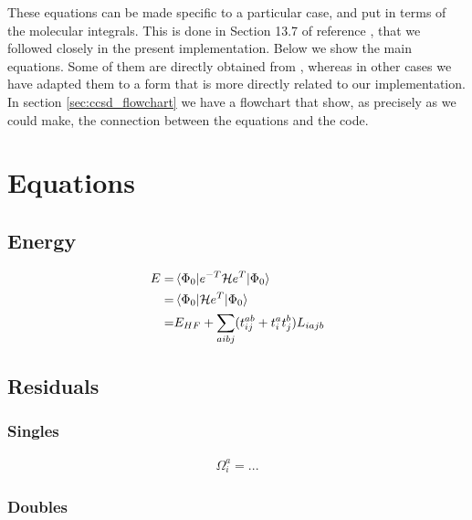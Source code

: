 These equations can be made specific to a particular case,
and put in terms of the molecular integrals.
This is done in Section 13.7 of reference \cite{}, that we followed closely in the present
implementation.
Below we show the main equations.
Some of them are directly obtained from \cite{},
whereas in other cases we have adapted them to a form that is more directly related to our implementation.
In section \ref{sec:ccsd_flowchart} we have a flowchart that show,
as precisely as we could make,
the connection between the equations and the code.


\section{Equations}

\subsection{Energy}
\hypertarget{sec:ccsd_energy}{}
\label{sec:ccsd_energy}

\begin{equation}
  \begin{split}
    E =& \mel{\Phi_0}{e^{-T}\ensuremath{\mathcal{H}}e^T}{\Phi_0}\\
    =& \mel{\Phi_0}{\ensuremath{\mathcal{H}}e^T}{\Phi_0}\\
    =& E_{HF} + \sum_{aibj}(t_{ij}^{ab} + t_i^at_j^b) L_{iajb}
  \end{split}
\end{equation}


\subsection{Residuals}
\hypertarget{sec:ccsd_res}{}
\label{sec:ccsd_res}

\subsubsection{Singles}
\hypertarget{sec:ccsd_res_sing}{}
\label{sec:ccsd_res_sing}

\begin{equation}
  \begin{split}
    \Omega_i^a = ...
  \end{split}
\end{equation}

\subsubsection{Doubles}
\hypertarget{sec:ccsd_res_doub}{}
\label{sec:ccsd_res_doub}

